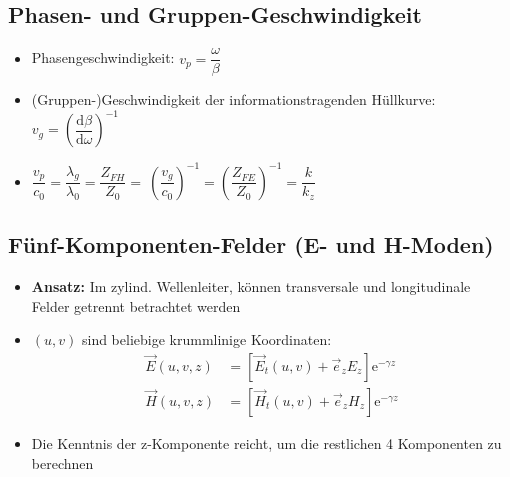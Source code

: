\subsection{Phasen- und Gruppen-Geschwindigkeit}
\begin{itemize}
    \itemsep0pt
    \item Phasengeschwindigkeit: \(v_p = \dfrac{\omega}{\beta}\)
    \item (Gruppen-)Geschwindigkeit der informationstragenden Hüllkurve:\\
        \(v_g = \left( \dfrac{\mathrm{d}\beta}{\mathrm{d}\omega} \right)^{-1}\)
    \item \(\dfrac{v_p}{c_0} =  \dfrac{\lambda_g}{\lambda_0} = \dfrac{Z_{FH}}{Z_0} =\
        \left(\dfrac{v_g}{c_0}\right)^{-1} = \left(\dfrac{Z_{FE}}{Z_0}\right)^{-1} = \dfrac{k}{k_z}\)
\end{itemize}
\subsection{Fünf-Komponenten-Felder (E- und H-Moden)}
\begin{itemize}
    \itemsep0pt
    \item \textbf{Ansatz:} Im zylind. Wellenleiter, können transversale und longitudinale Felder getrennt betrachtet werden
    \item \((u,v)\) sind beliebige krummlinige Koordinaten:
        \begin{align*}
            \vec{E}(u, v, z) &= \left[ \vec{E}_t(u,v) + \vec{e}_z E_z \right]\mathrm{e}^{-\gamma z}\\
            \vec{H}(u, v, z) &= \left[ \vec{H}_t(u,v) + \vec{e}_z H_z \right]\mathrm{e}^{-\gamma z}
        \end{align*}
    \item Die Kenntnis der z-Komponente reicht, um die restlichen 4 Komponenten zu berechnen
\end{itemize}

